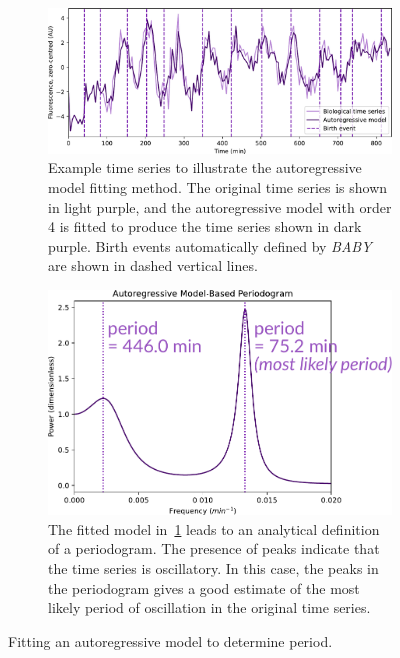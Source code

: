 \begin{figure}
  \centering
  \begin{subfigure}[htpb]{0.8\textwidth}
   \centering
   \includegraphics[width=\textwidth]{timeseries_example_for_ar}
   \caption{
     Example time series to illustrate the autoregressive model fitting method.
     The original time series is shown in light purple, and the autoregressive model with order 4 is fitted to produce the time series shown in dark purple.
     Birth events automatically defined by \textit{BABY} are shown in dashed vertical lines.
   }
   \label{fig:analysis-ar-timeseries}
  \end{subfigure}

  \begin{subfigure}[htpb]{0.8\textwidth}
   \centering
   \includegraphics[width=\textwidth]{ar}
   \caption{
     The fitted model in~\ref{fig:analysis-ar-timeseries} leads to an analytical definition of a periodogram.
     The presence of peaks indicate that the time series is oscillatory.
     In this case, the peaks in the periodogram gives a good estimate of the most likely period of oscillation in the original time series.
   }
   \label{fig:analysis-ar-periodogram}
  \end{subfigure}
  \caption{
    Fitting an autoregressive model to determine period.
  }
  \label{fig:analysis-ar}
\end{figure}


